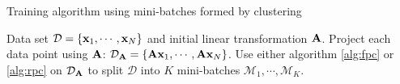 \begin{algorithm} 
	\caption{Training algorithm using mini-batches formed by clustering} 
	\label{alg:mini-batches}  
	\begin{algorithmic} [1]                 %
		\REQUIRE Data set $\mathcal{D}=\{\mathbf{x}_1,\cdots,\mathbf{x}_N\}$ and initial linear transformation $\mathbf{A}$.
		\REPEAT
			\STATE Project each data point using $\mathbf{A}$:  $\mathcal{D}_{\mathbf{A}}=\{\mathbf{A}\mathbf{x}_1,\cdots,\mathbf{A}\mathbf{x}_N\}$.
			\STATE Use either algorithm \ref{alg:fpc} or \ref{alg:rpc} on $\mathcal{D}_{\mathbf{A}}$ to split $\mathcal{D}$  into $K$ mini-batches $\mathcal{M}_1,\cdots,\mathcal{M}_K$.
			\ENDFOR
	\end{algorithmic}
\end{algorithm}

